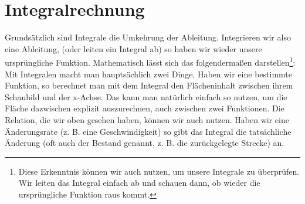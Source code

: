 \section{Integralrechnung}
	Grundsätzlich sind Integrale die Umkehrung der Ableitung. Integrieren wir also
	eine Ableitung, (oder leiten ein Integral ab) so haben wir wieder unsere
	ursprüngliche Funktion. Mathematisch lässt sich das folgendermaßen
	darstellen\footnote{Diese Erkenntnis können wir auch nutzen, um unsere
	Integrale zu überprüfen. Wir leiten das Integral einfach ab und schauen dann,
	ob wieder die ursprüngliche Funktion raus kommt.}:
	\formel{\[\int f'(x)\ dx=f(x)\]}
	Mit Integralen macht man hauptsächlich zwei Dinge. Haben wir eine bestimmte
	Funktion, so berechnet man mit dem Integral den Flächeninhalt zwischen ihrem
	Schaubild und der x-Achse. Das kann man natürlich einfach so nutzen, um die
	Fläche dazwischen explizit auszurechnen, auch zwischen zwei Funktionen. Die
	Relation, die wir oben gesehen haben, können wir auch nutzen. Haben wir eine
	Änderungsrate (z. B. eine Geschwindigkeit) so gibt das Integral die
	tatsächliche Änderung (oft auch der Bestand genannt, z. B. die zurückgelegte
	Strecke) an.
	

	

	

	

	

	
